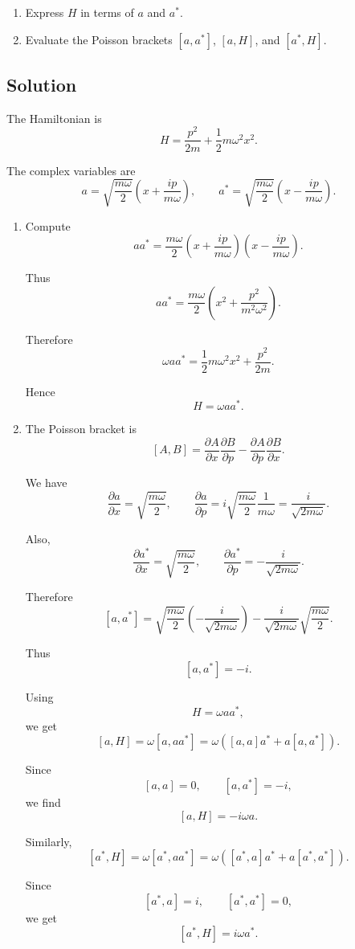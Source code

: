 \documentclass[11pt, a4paper]{article} %
\begin{document}
\begin{enumerate}
    \item[(a)] Express $H$ in terms of $a$ and $a^*$.

    \item[(b)] Evaluate the Poisson brackets $[a,a^*]$, $[a,H]$, and $[a^*,H]$.
\end{enumerate}

\subsection*{Solution}
The Hamiltonian is
\[
H=\frac{p^2}{2m}+\frac12 m\omega^2x^2.
\]

The complex variables are
\[
a=
\sqrt{\frac{m\omega}{2}}
\left(
x+\frac{ip}{m\omega}
\right),
\qquad
a^*
=
\sqrt{\frac{m\omega}{2}}
\left(
x-\frac{ip}{m\omega}
\right).
\]

\begin{enumerate}
\item[(a)] Compute
\[
aa^*
=
\frac{m\omega}{2}
\left(
x+\frac{ip}{m\omega}
\right)
\left(
x-\frac{ip}{m\omega}
\right).
\]

Thus
\[
aa^*
=
\frac{m\omega}{2}
\left(
x^2+\frac{p^2}{m^2\omega^2}
\right).
\]

Therefore
\[
\omega aa^*
=
\frac12 m\omega^2x^2+\frac{p^2}{2m}.
\]

Hence
\[
\boxed{
H=\omega aa^*.
}
\]

\item[(b)] The Poisson bracket is
\[
[A,B]
=
\frac{\partial A}{\partial x}\frac{\partial B}{\partial p}
-
\frac{\partial A}{\partial p}\frac{\partial B}{\partial x}.
\]

We have
\[
\frac{\partial a}{\partial x}
=
\sqrt{\frac{m\omega}{2}},
\qquad
\frac{\partial a}{\partial p}
=
i\sqrt{\frac{m\omega}{2}}\frac{1}{m\omega}
=
\frac{i}{\sqrt{2m\omega}}.
\]

Also,
\[
\frac{\partial a^*}{\partial x}
=
\sqrt{\frac{m\omega}{2}},
\qquad
\frac{\partial a^*}{\partial p}
=
-\frac{i}{\sqrt{2m\omega}}.
\]

Therefore
\[
[a,a^*]
=
\sqrt{\frac{m\omega}{2}}
\left(
-\frac{i}{\sqrt{2m\omega}}
\right)
-
\frac{i}{\sqrt{2m\omega}}
\sqrt{\frac{m\omega}{2}}.
\]

Thus
\[
\boxed{
[a,a^*]=-i.
}
\]

Using
\[
H=\omega aa^*,
\]
we get
\[
[a,H]
=
\omega[a,aa^*]
=
\omega\left([a,a]a^*+a[a,a^*]\right).
\]

Since
\[
[a,a]=0,
\qquad
[a,a^*]=-i,
\]
we find
\[
\boxed{
[a,H]=-i\omega a.
}
\]

Similarly,
\[
[a^*,H]
=
\omega[a^*,aa^*]
=
\omega\left([a^*,a]a^*+a[a^*,a^*]\right).
\]

Since
\[
[a^*,a]=i,
\qquad
[a^*,a^*]=0,
\]
we get
\[
\boxed{
[a^*,H]=i\omega a^*.
}
\]

\end{enumerate}
\end{document}

